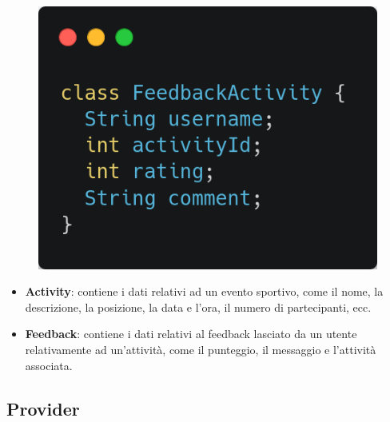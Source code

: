 \documentclass[a4paper,12pt]{article}
\begin{document}
\begin{figure}[h]
\begin{minipage}{0.45\textwidth}
        \includegraphics[width=0.9\linewidth]{img/feedback.png}
    \end{minipage}
\end{figure}


\begin{itemize}
    \item \textbf{Activity}: contiene i dati relativi ad un evento sportivo, come il nome, la descrizione, la posizione, la data e l'ora, il numero di partecipanti, ecc.
    \item \textbf{Feedback}: contiene i dati relativi al feedback lasciato da un utente relativamente ad un'attività, come il punteggio, il messaggio e l'attività  associata. 
\end{itemize}

\newpage

\subsection{Provider}
\end{document}
